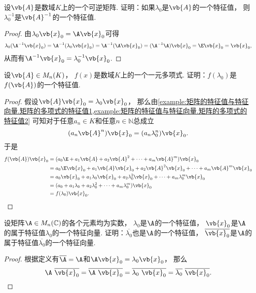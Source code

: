 \begin{example}\label{example:矩阵的特征值与特征向量.矩阵的多项式的特征值3}
设\(\vb{A}\)是数域\(K\)上的一个可逆矩阵.
证明：如果\(\lambda_0\)是\(\vb{A}\)的一个特征值，
则\(\lambda_0^{-1}\)是\(\vb{A}^{-1}\)的一个特征值.
\begin{proof}
由\(\lambda_0\vb{x}_0 = \A\vb{x}_0\)可得\[
	\lambda_0(\A^{-1}\vb{x}_0)
	= \A^{-1}(\lambda_0\vb{x}_0)
	= \A^{-1}(\A\vb{x}_0)
	= (\A^{-1}\A)\vb{x}_0
	= \E\vb{x}_0
	= \vb{x}_0,
\]
从而有\(\A^{-1}\vb{x}_0 = \lambda_0^{-1}\vb{x}_0\).
\end{proof}
\end{example}
\begin{example}\label{example:矩阵的特征值与特征向量.矩阵的多项式的特征值4}
设\(\vb{A} \in M_n(K)\)，
\(f(x)\)是数域\(K\)上的一个一元多项式.
证明：\(f(\lambda_0)\)是\(f(\vb{A})\)的一个特征值.
\begin{proof}
假设\(\vb{A} \vb{x}_0 = \lambda_0 \vb{x}_0\)，
那么由\cref{example:矩阵的特征值与特征向量.矩阵的多项式的特征值1,example:矩阵的特征值与特征向量.矩阵的多项式的特征值2}
可知对于任意\(a_n \in K\)和任意\(n\in\mathbb{N}\)总成立\begin{equation*}
	(a_n \vb{A}^n) \vb{x}_0
	= (a_n \lambda_0^n) \vb{x}_0.
\end{equation*}
于是\begin{align*}
	f(\vb{A}) \vb{x}_0
	&= (a_0 \E + a_1 \vb{A} + a_2 \vb{A}^2 + \dotsb + a_m \vb{A}^m) \vb{x}_0 \\
	&= a_0 \E \vb{x}_0 + a_1 \vb{A} \vb{x}_0 + a_2 \vb{A}^2 \vb{x}_0 + \dotsb + a_m \vb{A}^m \vb{x}_0 \\
	&= a_0 \vb{x}_0 + a_1 \lambda_0 \vb{x}_0 + a_2 \lambda_0^2 \vb{x}_0 + \dotsb + a_m \lambda_0^m \vb{x}_0 \\
	&= (a_0 + a_1 \lambda_0 + a_2 \lambda_0^2 + \dotsb + a_m \lambda_0^m) \vb{x}_0 \\
	&= f(\lambda_0) \vb{x}_0.
	\qedhere
\end{align*}
\end{proof}
\end{example}
\begin{example}
设矩阵\(\A \in M_n(\mathbb{C})\)的各个元素均为实数，
\(\lambda_0\)是\(\A\)的一个特征值，
\(\vb{x}_0\)是\(\A\)的属于特征值\(\lambda_0\)的一个特征向量.
证明：\(\overline{\lambda_0}\)也是\(\A\)的一个特征值，
\(\overline{\vb{x}_0}\)是\(\A\)的属于特征值\(\overline{\lambda_0}\)的一个特征向量.
\begin{proof}
根据定义有\(\overline{\A} = \A\)和\(\A \vb{x}_0 = \lambda_0 \vb{x}_0\)，
那么\[
	\A~\overline{\vb{x}_0}
	= \overline{\A~\vb{x}_0}
	= \overline{\lambda_0~\vb{x}_0}
	= \overline{\lambda_0}~\overline{\vb{x}_0}.
	\qedhere
\]
\end{proof}
\end{example}

